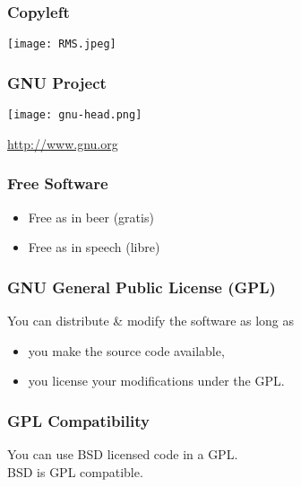 \begin{frame}[fragile]
\frametitle{Copyleft}

\centering
\texttt{[image: RMS.jpeg]}

\end{frame}

\begin{frame}[fragile]
\frametitle{GNU Project}

\centering
\texttt{[image: gnu-head.png]}

\centering
\href{http://www.gnu.org/}{http://www.gnu.org}

%
\end{frame}


\begin{frame}[fragile]
\frametitle{Free Software}

\begin{itemize}
\item Free as in beer (gratis)
\item Free as in speech (libre)
\end{itemize}

%
\end{frame}

\begin{frame}[fragile]
\frametitle{GNU General Public License (GPL)}

You can distribute \& modify the software as long as
\begin{itemize}
\item you make the source code available,
\item you license your modifications under the GPL.
\end{itemize}

\end{frame}

\begin{frame}[fragile]
\frametitle{GPL Compatibility}

You can use BSD licensed code in a GPL.\\
BSD is \alert{GPL compatible}.

\end{frame}

